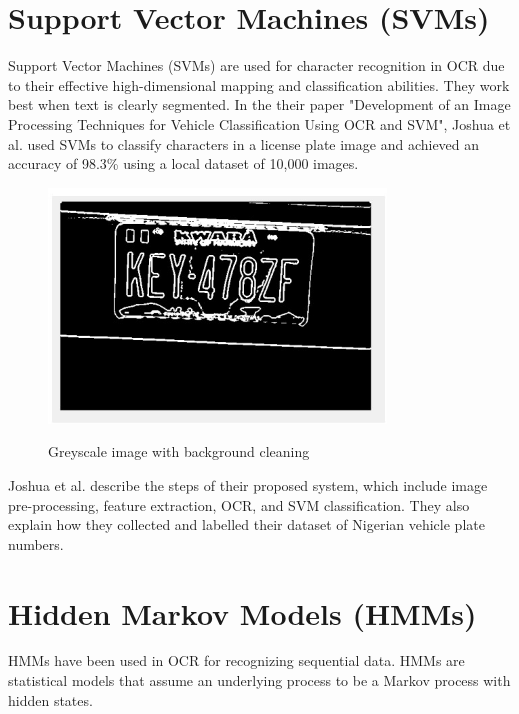 \newpage

\section{Support Vector Machines (SVMs)}

Support Vector Machines (SVMs) are used for character recognition in OCR due to their effective high-dimensional mapping and classification abilities. They work best when text is clearly segmented. In the their paper "Development of an Image Processing Techniques for Vehicle Classification Using OCR and SVM", Joshua et al. used SVMs to classify characters in a license plate image and achieved an accuracy of 98.3\% using a local dataset of 10,000 images.\cite{joshuaDevelopmentImageProcessing2023}

\begin{figure}[ht]
    \centering
    \includegraphics[width=0.8\textwidth]{Figures/SVM_Joshua.jpg}
    \caption[Development of an Image Processing Technique for Vehicle Classification using OCR and SVM]{Greyscale image with background cleaning}\cite{joshuaDevelopmentImageProcessing2023}
    \label{fig:Joshua SVM Paper}
\end{figure}

Joshua et al. describe the steps of their proposed system, which include image pre-processing, feature extraction, OCR, and SVM classification. They also explain how they collected and labelled their dataset of Nigerian vehicle plate numbers.

\newpage

\section{Hidden Markov Models (HMMs)}

HMMs have been used in OCR for recognizing sequential data. HMMs are statistical models that assume an underlying process to be a Markov process with hidden states.


